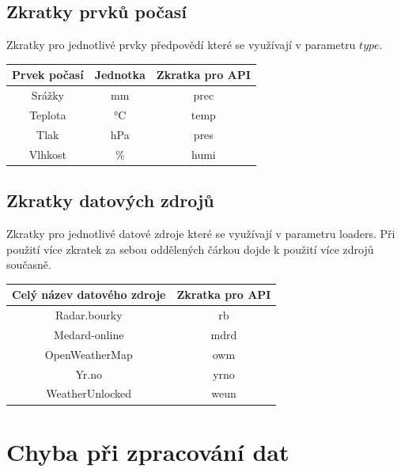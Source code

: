 \documentclass[czech,bachelor,dept460,male,csharp,cpdeclaration]{diploma}
\begin{document}
	\subsection{Zkratky prvků počasí}
	
	Zkratky pro jednotlivé prvky předpovědí které se využívají v parametru $type$.
	
	\begin{center}
		
		
		\begin{tabular}{c c c}
			Prvek počasí & Jednotka & Zkratka pro API\\
			\midrule
			Srážky & mm & prec \\
			Teplota & °C & temp \\
			Tlak & hPa & pres \\
			Vlhkost & \% & humi \\
		\end{tabular}
	\end{center}
	
	\subsection{Zkratky datových zdrojů}
	
	Zkratky pro jednotlivé datové zdroje které se využívají v parametru loaders. Při použití více zkratek za sebou oddělených čárkou dojde k použití více zdrojů současně.
	
	\begin{center}
		
		
		\begin{tabular}{c c}
			Celý název datového zdroje & Zkratka pro API\\
			\midrule
			Radar.bourky & rb \\
			Medard-online & mdrd \\
			OpenWeatherMap & owm \\
			Yr.no & yrno \\
			WeatherUnlocked & weun \\
		\end{tabular}
	\end{center}
	
	\section{Chyba při zpracování dat}
	
\end{document}
